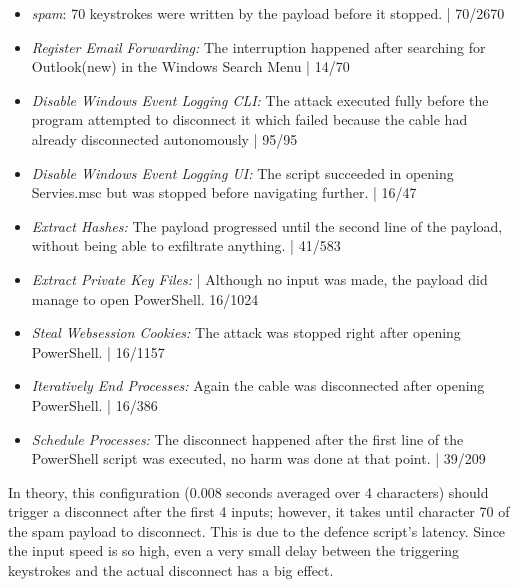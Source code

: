 \begin{itemize}
    \item  \emph{spam}: 70 keystrokes were written by the payload before it stopped. | 70/2670
    \item  \emph{Register Email Forwarding:} The interruption happened after searching for Outlook(new) in the Windows Search Menu  | 14/70 
    \item  \emph{Disable Windows Event Logging CLI:}  The attack executed fully before the program attempted to disconnect it which failed because the cable had already disconnected autonomously | 95/95
    \item  \emph{Disable Windows Event Logging UI:} The script succeeded in opening Servies.msc but was stopped before navigating further. | 16/47
    \item  \emph{Extract Hashes:}  The payload progressed until the second line of the payload, without being able to exfiltrate anything. | 41/583
    \item  \emph{Extract Private Key Files:}  | Although no input was made, the payload did manage to open PowerShell. 16/1024
    \item  \emph{Steal Websession Cookies:} The attack was stopped right after opening PowerShell. | 16/1157
    \item  \emph{Iteratively End Processes:} Again the cable was disconnected after opening PowerShell. | 16/386
    \item  \emph{Schedule Processes:} The disconnect happened after the first line of the PowerShell script was executed, no harm was done at that point. | 39/209
\end{itemize}

In theory, this configuration (0.008 seconds averaged over 4 characters) should trigger a disconnect after the first 4 inputs; however, it takes until character 70 of the spam payload to disconnect. This is due to the defence script's latency. Since the input speed is so high, even a very small delay between the triggering keystrokes and the actual disconnect has a big effect.


